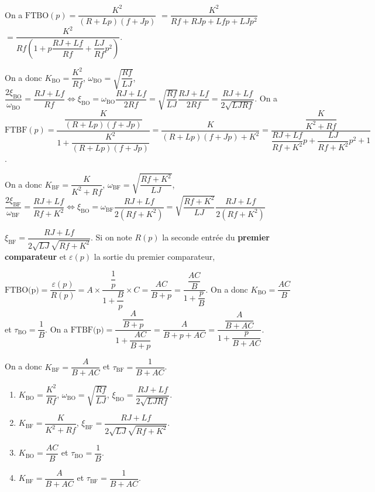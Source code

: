 \begin{corrigebox}
On a $\text{FTBO}(p)=\dfrac{K^2}{\left(R+Lp\right)\left(f+Jp\right)}$
$=\dfrac{K^2}{Rf+RJp+Lfp+LJp^2}$
$=\dfrac{K^2}{Rf\left(1+p\dfrac{RJ+Lf}{Rf}+\dfrac{LJ}{Rf}p^2\right)}$.

On a donc $K_{\text{BO}}=\dfrac{K^2}{Rf}$, 
$\omega_{\text{BO}} = \sqrt{\dfrac{Rf}{LJ}}$,
$\dfrac{2\xi_{\text{BO}} }{\omega_{\text{BO}}}=\dfrac{RJ+Lf}{Rf} \Leftrightarrow
\xi_{\text{BO}} =\omega_{\text{BO}}\dfrac{RJ+Lf}{2Rf}
=\sqrt{\dfrac{Rf}{LJ}}\dfrac{RJ+Lf}{2Rf}
=\dfrac{RJ+Lf}{2\sqrt{LJRf}}$.
On a $\text{FTBF}(p)=\dfrac{\dfrac{K}{\left(R+Lp\right)\left(f+Jp\right)}}{1+\dfrac{K^2}{\left(R+Lp\right)\left(f+Jp\right)}}
=\dfrac{K}{\left(R+Lp\right)\left(f+Jp\right)+K^2}
=\dfrac{\dfrac{K}{K^2+Rf}}{\dfrac{RJ+Lf}{Rf+K^2}p+\dfrac{LJ}{Rf+K^2}p^2+1}$.

On a donc $K_{\text{BF}}=\dfrac{K}{K^2+Rf}$, 
$\omega_{\text{BF}} = \sqrt{\dfrac{Rf+K^2}{LJ}}$,
$\dfrac{2\xi_{\text{BF}} }{\omega_{\text{BF}}}=\dfrac{RJ+Lf}{Rf+K^2} \Leftrightarrow
\xi_{\text{BO}} =\omega_{\text{BF}}\dfrac{RJ+Lf}{2\left(Rf+K^2\right)}
=\sqrt{\dfrac{Rf+K^2}{LJ}}\dfrac{RJ+Lf}{2\left(Rf+K^2\right)}$

$\xi_{\text{BF}}=\dfrac{RJ+Lf}{2\sqrt{LJ}\sqrt{Rf+K^2}}$.
Si on note $R(p)$ la seconde entrée du \textbf{premier comparateur} et $\varepsilon(p)$ la sortie du premier comparateur,  

$\text{FTBO(p)}=\dfrac{\varepsilon(p)}{R(p)} = A \times \dfrac{\dfrac{1}{p}}{1+\dfrac{B}{p}}\times C = \dfrac{AC}{B+p} = \dfrac{\dfrac{AC}{B}}{1+\dfrac{p}{B}}$.
On a donc $K_{\text{BO}}=\dfrac{AC}{B}$ et $\tau_{\text{BO}}=\dfrac{1}{B}$.
On a
$\text{FTBF(p)} = \dfrac{\dfrac{A}{B+p}}{1+\dfrac{AC}{B+p}}=\dfrac{A}{B+p+AC}=\dfrac{\dfrac{A}{B+AC}}{1+\dfrac{p}{B+AC}}$.

On a donc $K_{\text{BF}}=\dfrac{A}{B+AC}$ et $\tau_{\text{BF}}=\dfrac{1}{B+AC}$.

\begin{enumerate}
\item $K_{\text{BO}}=\dfrac{K^2}{Rf}$, 
$\omega_{\text{BO}} = \sqrt{\dfrac{Rf}{LJ}}$,
$\xi_{\text{BO}} =\dfrac{RJ+Lf}{2\sqrt{LJRf}}$.
\item $K_{\text{BF}}=\dfrac{K}{K^2+Rf}$, 
$\xi_{\text{BF}}=\dfrac{RJ+Lf}{2\sqrt{LJ}\sqrt{Rf+K^2}}$.
\item $K_{\text{BO}}=\dfrac{AC}{B}$ et $\tau_{\text{BO}}=\dfrac{1}{B}$.
\item $K_{\text{BF}}=\dfrac{A}{B+AC}$ et $\tau_{\text{BF}}=\dfrac{1}{B+AC}$.
\end{enumerate}
\end{corrigebox}
